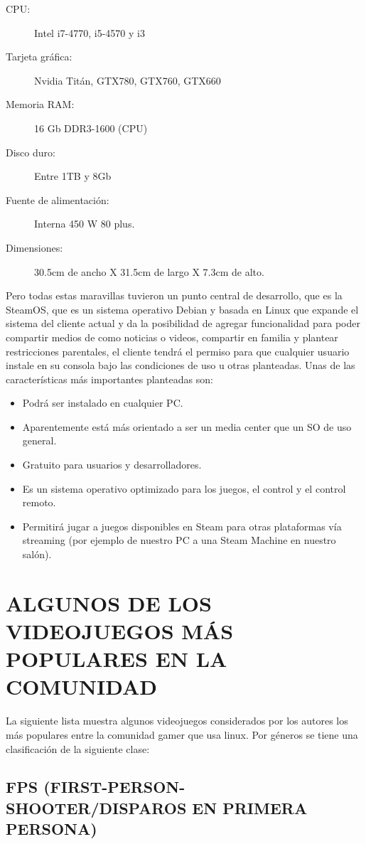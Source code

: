 \begin{description}
\item[ CPU:] Intel i7-4770, i5-4570 y i3
\item[ Tarjeta gráfica:] Nvidia Titán, GTX780, GTX760, GTX660
\item[ Memoria RAM:] 16 Gb DDR3-1600 (CPU)
\item[ Disco duro:]Entre 1TB y 8Gb
\item[ Fuente de alimentación:] Interna 450 W 80 plus.
\item[ Dimensiones:] 30.5cm de ancho X 31.5cm de largo X 7.3cm
de alto.
\end{description}

Pero todas estas maravillas tuvieron un punto central de
desarrollo, que es la SteamOS, que es un sistema operativo
Debian y basada en Linux que expande el sistema del cliente
actual y da la posibilidad de agregar funcionalidad para poder
compartir medios de como noticias o videos, compartir en
familia y plantear restricciones parentales, el cliente tendrá el
permiso para que cualquier usuario instale en su consola bajo
las condiciones de uso u otras planteadas.
Unas de las características más importantes planteadas son:

\begin{itemize}
\item Podrá ser instalado en cualquier PC.
\item Aparentemente está más orientado a ser un media center que
un SO de uso general.
\item Gratuito para usuarios y desarrolladores.
\item Es un sistema operativo optimizado para los juegos, el control y
el control remoto.
\item Permitirá jugar a juegos disponibles en Steam para otras
plataformas vía streaming (por ejemplo de nuestro PC a una
Steam Machine en nuestro salón).
\end{itemize}

\section*{ALGUNOS DE LOS VIDEOJUEGOS MÁS POPULARES EN LA COMUNIDAD}
La siguiente lista muestra algunos videojuegos considerados por
los autores los más populares entre la comunidad gamer que usa
linux.
Por géneros se tiene una clasificación de la siguiente clase:

\subsection*{FPS (FIRST-PERSON-SHOOTER/DISPAROS EN PRIMERA PERSONA)}

